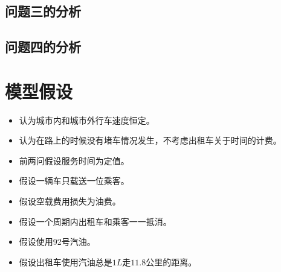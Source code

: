 \documentclass[withoutpreface,bwprint]{cumcmthesis} %
\begin{document}
\subsection{问题三的分析}


\subsection{问题四的分析}



\newpage
\section{模型假设}
\begin{itemize}
	\item 认为城市内和城市外行车速度恒定。
	\item 认为在路上的时候没有堵车情况发生，不考虑出租车关于时间的计费。
	\item 前两问假设服务时间为定值。
	\item 假设一辆车只载送一位乘客。
	\item 假设空载费用损失为油费。
	\item 假设一个周期内出租车和乘客一一抵消。
	\item 假设使用92号汽油。
	\item 假设出租车使用汽油总是$1L$走$11.8$公里的距离。
\end{itemize}

\newpage
\end{document}
